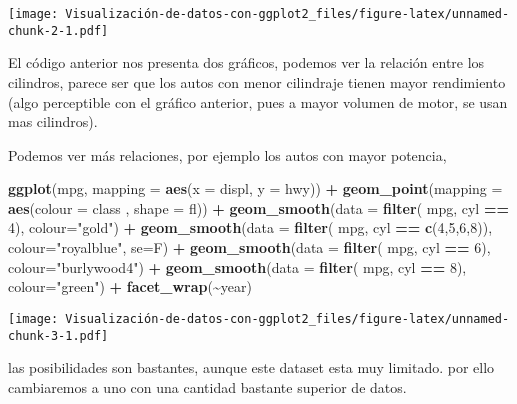 \documentclass[
]{article}
\newenvironment{Shaded}{\begin{snugshade}}{\end{snugshade}}
\newcommand{\DataTypeTok}[1]{\textcolor[rgb]{0.13,0.29,0.53}{#1}}
\newcommand{\DecValTok}[1]{\textcolor[rgb]{0.00,0.00,0.81}{#1}}
\newcommand{\KeywordTok}[1]{\textcolor[rgb]{0.13,0.29,0.53}{\textbf{#1}}}
\newcommand{\NormalTok}[1]{#1}
\newcommand{\OperatorTok}[1]{\textcolor[rgb]{0.81,0.36,0.00}{\textbf{#1}}}
\newcommand{\StringTok}[1]{\textcolor[rgb]{0.31,0.60,0.02}{#1}}
\begin{document}
\texttt{[image: Visualización-de-datos-con-ggplot2\_files/figure-latex/unnamed-chunk-2-1.pdf]}

El código anterior nos presenta dos gráficos, podemos ver la relación
entre los cilindros, parece ser que los autos con menor cilindraje
tienen mayor rendimiento (algo perceptible con el gráfico anterior, pues
a mayor volumen de motor, se usan mas cilindros).

Podemos ver más relaciones, por ejemplo los autos con mayor potencia,

\begin{Shaded}
\begin{Highlighting}[]
\KeywordTok{ggplot}\NormalTok{(mpg, }\DataTypeTok{mapping =} \KeywordTok{aes}\NormalTok{(}\DataTypeTok{x =}\NormalTok{ displ, }\DataTypeTok{y =}\NormalTok{ hwy)) }\OperatorTok{+}
\StringTok{  }\KeywordTok{geom\_point}\NormalTok{(}\DataTypeTok{mapping =} \KeywordTok{aes}\NormalTok{(}\DataTypeTok{colour =}\NormalTok{ class , }\DataTypeTok{shape =}\NormalTok{ fl)) }\OperatorTok{+}
\StringTok{  }\KeywordTok{geom\_smooth}\NormalTok{(}\DataTypeTok{data =} \KeywordTok{filter}\NormalTok{( mpg, cyl }\OperatorTok{==}\StringTok{ }\DecValTok{4}\NormalTok{), }\DataTypeTok{colour=}\StringTok{"gold"}\NormalTok{) }\OperatorTok{+}
\StringTok{  }\KeywordTok{geom\_smooth}\NormalTok{(}\DataTypeTok{data =} \KeywordTok{filter}\NormalTok{( mpg, cyl }\OperatorTok{==}\StringTok{ }\KeywordTok{c}\NormalTok{(}\DecValTok{4}\NormalTok{,}\DecValTok{5}\NormalTok{,}\DecValTok{6}\NormalTok{,}\DecValTok{8}\NormalTok{)), }
              \DataTypeTok{colour=}\StringTok{"royalblue"}\NormalTok{, }\DataTypeTok{se=}\NormalTok{F) }\OperatorTok{+}
\StringTok{  }\KeywordTok{geom\_smooth}\NormalTok{(}\DataTypeTok{data =} \KeywordTok{filter}\NormalTok{( mpg, cyl }\OperatorTok{==}\StringTok{ }\DecValTok{6}\NormalTok{), }\DataTypeTok{colour=}\StringTok{"burlywood4"}\NormalTok{) }\OperatorTok{+}\StringTok{  }
\StringTok{  }\KeywordTok{geom\_smooth}\NormalTok{(}\DataTypeTok{data =} \KeywordTok{filter}\NormalTok{( mpg, cyl }\OperatorTok{==}\StringTok{ }\DecValTok{8}\NormalTok{), }\DataTypeTok{colour=}\StringTok{"green"}\NormalTok{) }\OperatorTok{+}
\StringTok{  }\KeywordTok{facet\_wrap}\NormalTok{(}\OperatorTok{\textasciitilde{}}\NormalTok{year)}
\end{Highlighting}
\end{Shaded}

\texttt{[image: Visualización-de-datos-con-ggplot2\_files/figure-latex/unnamed-chunk-3-1.pdf]}

las posibilidades son bastantes, aunque este dataset esta muy limitado.
por ello cambiaremos a uno con una cantidad bastante superior de datos.
\end{document}
